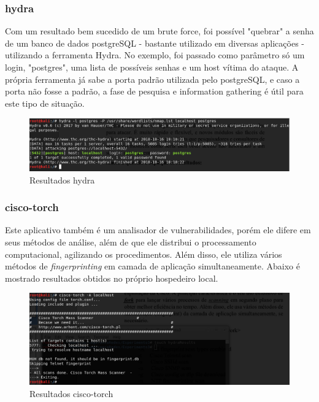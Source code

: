 \documentclass[journal]{IEEEtran}
\begin{document}
\subsubsection{hydra}
Com um resultado bem sucedido de um brute force, foi possível "quebrar" a senha de um banco de dados postgreSQL - bastante utilizado em diversas aplicações - utilizando a ferramenta Hydra. No exemplo, foi passado como parâmetro só um login, "postgres", uma lista de possíveis senhas e um host vítima do ataque. A própria ferramenta já sabe a porta padrão utilizada pelo postgreSQL, e caso a porta não fosse a padrão, a fase de pesquisa e information gathering é útil para este tipo de situação.


\begin{figure}[h!]
	\includegraphics[width=\linewidth]{../hydraPostgresLocalhost.png}
	\caption{Resultados hydra}
	\label{fig:hydra_results}
\end{figure}

\subsubsection{cisco-torch}
Este aplicativo também é um analisador de vulnerabilidades, porém ele difere em seus métodos de análise, além de que ele distribui o processamento computacional, agilizando os procedimentos. Além disso, ele utiliza vários métodos de \textit{fingerprinting} em camada de aplicação simultaneamente. Abaixo é mostrado resultados obtidos no próprio hospedeiro local.

\begin{figure}[h!]
	\includegraphics[width=\linewidth]{../simpleCiscoTorchLocalhost.png}
	\caption{Resultados cisco-torch}
	\label{fig:cisco_torch_results}
\end{figure}
\end{document}
